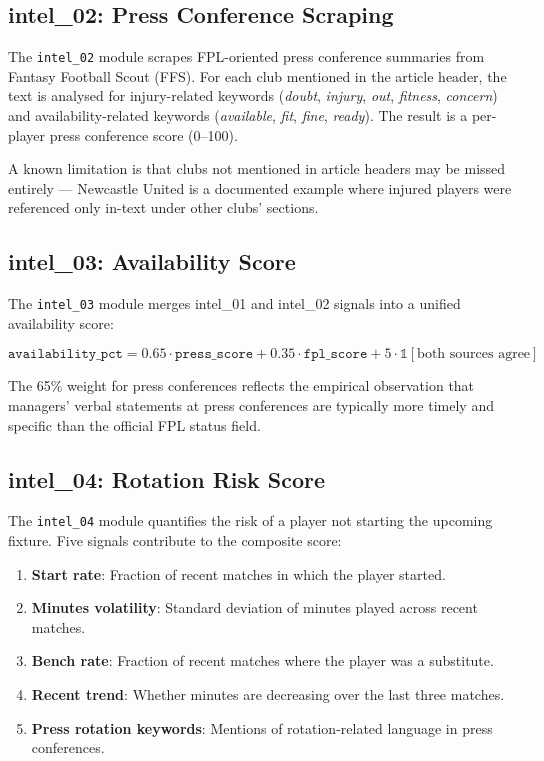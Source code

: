 \subsection{intel\_02: Press Conference Scraping}

The \texttt{intel\_02} module scrapes FPL-oriented press conference summaries from Fantasy Football Scout (FFS). For each club mentioned in the article header, the text is analysed for injury-related keywords (\textit{doubt}, \textit{injury}, \textit{out}, \textit{fitness}, \textit{concern}) and availability-related keywords (\textit{available}, \textit{fit}, \textit{fine}, \textit{ready}). The result is a per-player press conference score (0--100).

A known limitation is that clubs not mentioned in article headers may be missed entirely — Newcastle United is a documented example where injured players were referenced only in-text under other clubs' sections.

\subsection{intel\_03: Availability Score}

The \texttt{intel\_03} module merges intel\_01 and intel\_02 signals into a unified availability score:

\begin{equation}
\texttt{availability\_pct} = 0.65 \cdot \texttt{press\_score} + 0.35 \cdot \texttt{fpl\_score} + 5 \cdot \mathbb{1}[\text{both sources agree}]
\end{equation}

The 65\% weight for press conferences reflects the empirical observation that managers' verbal statements at press conferences are typically more timely and specific than the official FPL status field.

\subsection{intel\_04: Rotation Risk Score}

The \texttt{intel\_04} module quantifies the risk of a player not starting the upcoming fixture. Five signals contribute to the composite score:

\begin{enumerate}
  \item \textbf{Start rate}: Fraction of recent matches in which the player started.
  \item \textbf{Minutes volatility}: Standard deviation of minutes played across recent matches.
  \item \textbf{Bench rate}: Fraction of recent matches where the player was a substitute.
  \item \textbf{Recent trend}: Whether minutes are decreasing over the last three matches.
  \item \textbf{Press rotation keywords}: Mentions of rotation-related language in press conferences.
\end{enumerate}

